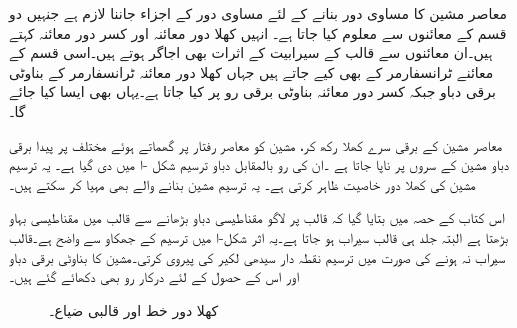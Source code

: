 معاصر مشین کا مساوی دور بنانے کے لئے مساوی دور کے اجزاء جاننا لازم ہے جنہیں دو قسم کے معائنوں سے معلوم کیا جاتا ہے۔ انہیں کھلا دور معائنہ اور کسر دور معائنہ کہتے ہیں۔ان معائنوں سے قالب کے سیرابیت کے اثرات بھی اجاگر ہوتے ہیں۔اسی قسم کے معائنے ٹرانسفارمر کے  بھی کیے جاتے ہیں جہاں  کھلا دور معائنہ ٹرانسفارمر کے بناوٹی  برقی دباو جبکہ کسر دور معائنہ بناوٹی  برقی رو پر کیا جاتا ہے۔یہاں بھی ایسا کیا جائے گا۔ 

معاصر مشین کے برقی سرے کھلا رکھ کر، مشین کو معاصر رفتار پر گھماتے ہوئے مختلف  پر پیدا برقی دباو   مشین کے سروں پر  ناپا جاتا ہے ۔ان کی  رو  بالمقابل دباو   ترسیم شکل -ا میں دی گیا ہے۔ یہ ترسیم مشین کی کھلا دور خاصیت ظاہر کرتی ہے۔ یہ ترسیم مشین بنانے والے بھی مہیا کر سکتے ہیں۔

اس کتاب کے حصہ  میں بتایا گیا  کہ قالب پر لاگو مقناطیسی دباو بڑھانے سے قالب میں مقناطیسی بہاو بڑھتا ہے البتہ جلد ہی قالب سیراب ہو جاتا ہے۔یہ اثر  شکل-ا میں ترسیم کے جھکاو  سے واضح ہے۔قالب سیراب نہ ہونے کی صورت میں  ترسیم  نقطہ دار سیدھی لکیر کی پیروی کرتی۔مشین کا بناوٹی برقی دباو اور اس کے حصول کے لئے درکار  رو  بھی دکھائے گئے ہیں۔
\begin{figure}
\centering
\begin{subfigure}{0.45\textwidth}
\centering
{}
\caption{}
\end{subfigure}%
\begin{subfigure}{0.45\textwidth}
\centering
{}%
\caption{}
\end{subfigure}%
\caption{کھلا دور خط اور قالبی ضیاع۔}
\label{شکل_معاصر_کھلے_دور_خط}
\end{figure}

